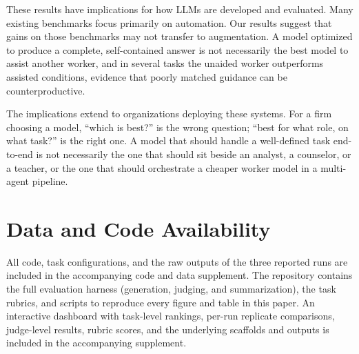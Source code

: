 

These results have implications for how LLMs are developed and evaluated. Many existing benchmarks focus primarily on automation. Our results suggest that gains on those benchmarks may not transfer to augmentation. A model optimized to produce a complete, self-contained answer is not necessarily the best model to assist another worker, and in several tasks the unaided worker outperforms assisted conditions, evidence that poorly matched guidance can be counterproductive.

The implications extend to organizations deploying these systems. For a firm choosing a model, ``which is best?'' is the wrong question; ``best for what role, on what task?'' is the right one. A model that should handle a well-defined task end-to-end is not necessarily the one that should sit beside an analyst, a counselor, or a teacher, or the one that should orchestrate a cheaper worker model in a multi-agent pipeline.

\section*{Data and Code Availability}
All code, task configurations, and the raw outputs of the three reported runs are
included in the accompanying code and data supplement.
The repository contains the full evaluation harness (generation, judging, and
summarization), the task rubrics, and scripts to reproduce every figure and table
in this paper. An interactive dashboard with task-level rankings, per-run
replicate comparisons, judge-level results, rubric scores, and the underlying
scaffolds and outputs is included in the accompanying supplement.
